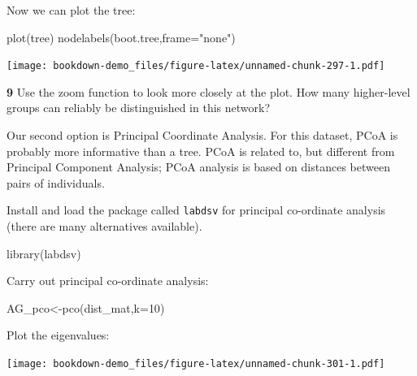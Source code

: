 \documentclass[
]{book}
\makeatletter
\newenvironment{Shaded}{\begin{snugshade}}{\end{snugshade}}
\newcommand{\AttributeTok}[1]{\textcolor[rgb]{0.77,0.63,0.00}{#1}}
\newcommand{\DecValTok}[1]{\textcolor[rgb]{0.00,0.00,0.81}{#1}}
\newcommand{\FunctionTok}[1]{\textcolor[rgb]{0.00,0.00,0.00}{#1}}
\newcommand{\NormalTok}[1]{#1}
\newcommand{\OtherTok}[1]{\textcolor[rgb]{0.56,0.35,0.01}{#1}}
\newcommand{\SpecialCharTok}[1]{\textcolor[rgb]{0.00,0.00,0.00}{#1}}
\newcommand{\StringTok}[1]{\textcolor[rgb]{0.31,0.60,0.02}{#1}}
\newenvironment{kframe}{%
\medskip{}
\setlength{\fboxsep}{.8em}
 \def\at@end@of@kframe{}%
 \ifinner\ifhmode%
  \def\at@end@of@kframe{\end{minipage}}%
  \begin{minipage}{\columnwidth}%
 \fi\fi%
 \def\FrameCommand##1{\hskip\@totalleftmargin \hskip-\fboxsep
 \colorbox{shadecolor}{##1}\hskip-\fboxsep
     \hskip-\linewidth \hskip-\@totalleftmargin \hskip\columnwidth}%
 \MakeFramed {\advance\hsize-\width
   \@totalleftmargin\z@ \linewidth\hsize
   \@setminipage}}%
 {\par\unskip\endMakeFramed%
 \at@end@of@kframe}
\newenvironment{rmdblock}[1]
  {
  \begin{itemize}
  \renewcommand{\labelitemi}{
    \raisebox{-.7\height}[0pt][0pt]{
      {\setkeys{Gin}{width=3em,keepaspectratio}\texttt{[image: images/\#1]}}
    }
  }
  \setlength{\fboxsep}{1em}
  \begin{kframe}
  \item
  }
  {
  \end{kframe}
  \end{itemize}
  }
\newenvironment{rmdquiz}
  {\begin{rmdblock}{quiz}}
  {\end{rmdblock}}
\makeatother
\begin{document}
Now we can plot the tree:

\begin{Shaded}
\begin{Highlighting}[]
\FunctionTok{plot}\NormalTok{(tree)}
\FunctionTok{nodelabels}\NormalTok{(boot.tree,}\AttributeTok{frame=}\StringTok{"none"}\NormalTok{)}
\end{Highlighting}
\end{Shaded}

\texttt{[image: bookdown-demo\_files/figure-latex/unnamed-chunk-297-1.pdf]}

\begin{rmdquiz}
\textbf{9} Use the zoom function to look more closely at the plot. How many higher-level groups can reliably be distinguished in this network?
\end{rmdquiz}

Our second option is Principal Coordinate Analysis. For this dataset, PCoA is probably more informative than a tree. PCoA is related to, but different from Principal Component Analysis; PCoA analysis is based on distances between pairs of individuals.

Install and load the package called \texttt{labdsv} for principal co-ordinate analysis (there are many alternatives available).

\begin{Shaded}
\begin{Highlighting}[]
\FunctionTok{library}\NormalTok{(labdsv)}
\end{Highlighting}
\end{Shaded}

Carry out principal co-ordinate analysis:

\begin{Shaded}
\begin{Highlighting}[]
\NormalTok{AG\_pco}\OtherTok{\textless{}{-}}\FunctionTok{pco}\NormalTok{(dist\_mat,}\AttributeTok{k=}\DecValTok{10}\NormalTok{)}
\end{Highlighting}
\end{Shaded}

Plot the eigenvalues:

\begin{Shaded}
\end{Shaded}

\texttt{[image: bookdown-demo\_files/figure-latex/unnamed-chunk-301-1.pdf]}
\end{document}
